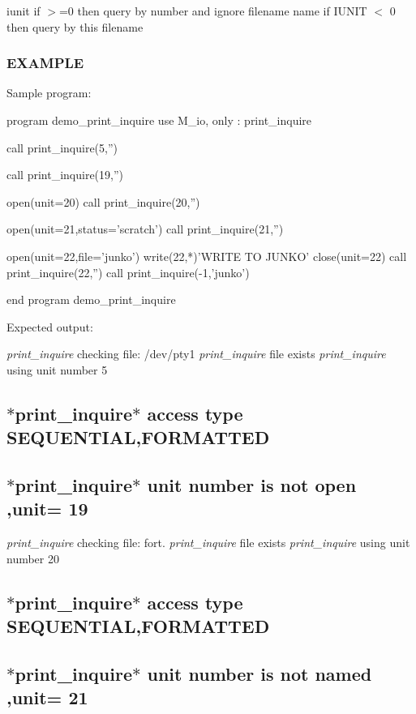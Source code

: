 iunit if $>$=0 then query by number and ignore filename name if I\+U\+N\+IT $<$ 0 then query by this filename \subsubsection*{E\+X\+A\+M\+P\+LE}

\begin{DoxyVerb}Sample program:

   program demo_print_inquire
   use M_io, only : print_inquire

   call print_inquire(5,'')

   call print_inquire(19,'')

   open(unit=20)
   call print_inquire(20,'')

   open(unit=21,status='scratch')
   call print_inquire(21,'')

   open(unit=22,file='junko')
   write(22,*)'WRITE TO JUNKO'
   close(unit=22)
   call print_inquire(22,'')
   call print_inquire(-1,'junko')

   end program demo_print_inquire
\end{DoxyVerb}


Expected output\+: 

 {\itshape print\+\_\+inquire} checking file\+: /dev/pty1 {\itshape print\+\_\+inquire} file exists {\itshape print\+\_\+inquire} using unit number 5 \subsection*{$\ast$print\+\_\+inquire$\ast$ access type S\+E\+Q\+U\+E\+N\+T\+I\+AL,F\+O\+R\+M\+A\+T\+T\+ED }

\subsection*{$\ast$print\+\_\+inquire$\ast$ unit number is not open ,unit= 19 }

{\itshape print\+\_\+inquire} checking file\+: fort. {\itshape print\+\_\+inquire} file exists {\itshape print\+\_\+inquire} using unit number 20 \subsection*{$\ast$print\+\_\+inquire$\ast$ access type S\+E\+Q\+U\+E\+N\+T\+I\+AL,F\+O\+R\+M\+A\+T\+T\+ED }

\subsection*{$\ast$print\+\_\+inquire$\ast$ unit number is not named ,unit= 21 }

